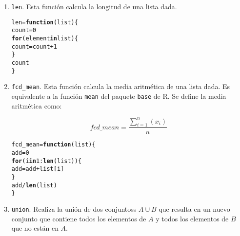 \documentclass[12pt]{report}\usepackage[]{graphicx}\usepackage[dvipsnames]{xcolor}
\makeatletter
\newcommand{\hlnum}[1]{\textcolor[rgb]{0.686,0.059,0.569}{#1}}%
\newcommand{\hlopt}[1]{\textcolor[rgb]{0,0,0}{#1}}%
\newcommand{\hlstd}[1]{\textcolor[rgb]{0.345,0.345,0.345}{#1}}%
\newcommand{\hlkwa}[1]{\textcolor[rgb]{0.161,0.373,0.58}{\textbf{#1}}}%
\newcommand{\hlkwb}[1]{\textcolor[rgb]{0.69,0.353,0.396}{#1}}%
\newcommand{\hlkwc}[1]{\textcolor[rgb]{0.333,0.667,0.333}{#1}}%
\newcommand{\hlkwd}[1]{\textcolor[rgb]{0.737,0.353,0.396}{\textbf{#1}}}%
\newenvironment{kframe}{%
 \def\at@end@of@kframe{}%
 \ifinner\ifhmode%
  \def\at@end@of@kframe{\end{minipage}}%
  \begin{minipage}{\columnwidth}%
 \fi\fi%
 \def\FrameCommand##1{\hskip\@totalleftmargin \hskip-\fboxsep
 \colorbox{shadecolor}{##1}\hskip-\fboxsep
     \hskip-\linewidth \hskip-\@totalleftmargin \hskip\columnwidth}%
 \MakeFramed {\advance\hsize-\width
   \@totalleftmargin\z@ \linewidth\hsize
   \@setminipage}}%
 {\par\unskip\endMakeFramed%
 \at@end@of@kframe}
\newenvironment{knitrout}{}{} %
\makeatother
\begin{document}
	 	\begin{enumerate}
	 		\item \texttt{len}. Esta función calcula la longitud de una lista dada.
	 		
\begin{knitrout}
\color{fgcolor}\begin{kframe}
\begin{alltt}
\hlstd{len} \hlkwb{=} \hlkwa{function}\hlstd{(}\hlkwc{list}\hlstd{) \{}
        \hlstd{count} \hlkwb{=} \hlnum{0}
        \hlkwa{for} \hlstd{(element} \hlkwa{in} \hlstd{list) \{}
                \hlstd{count} \hlkwb{=} \hlstd{count} \hlopt{+} \hlnum{1}
        \hlstd{\}}
        \hlstd{count}
\hlstd{\}}
\end{alltt}
\end{kframe}
\end{knitrout}
 		
 		\item \texttt{fcd\_mean}. Esta función calcula la media aritmética de una lista dada. Es equivalente a la función \texttt{mean} del paquete \texttt{base} de R. Se define la media aritmética como:
 		
 		$$
 		fcd\_mean = \frac{\displaystyle\sum_{i=1}^n (x_i)}{n}
 		$$
 		
\begin{knitrout}
\color{fgcolor}\begin{kframe}
\begin{alltt}
\hlstd{fcd_mean} \hlkwb{=} \hlkwa{function}\hlstd{(}\hlkwc{list}\hlstd{) \{}
        \hlstd{add} \hlkwb{=} \hlnum{0}
        \hlkwa{for} \hlstd{(i} \hlkwa{in} \hlnum{1}\hlopt{:}\hlkwd{len}\hlstd{(list)) \{}
                \hlstd{add} \hlkwb{=} \hlstd{add} \hlopt{+} \hlstd{list[i]}
        \hlstd{\}}
        \hlstd{add} \hlopt{/} \hlkwd{len}\hlstd{(list)}
\hlstd{\}}
\end{alltt}
\end{kframe}
\end{knitrout}
 		
 		\item \texttt{union}. Realiza la unión de dos conjuntoss $A \cup B$ que resulta en un nuevo conjunto que contiene todos los elementos de $A$ y todos los elementos de $B$ que no están en $A$.
 		

\end{enumerate}
\end{document}
